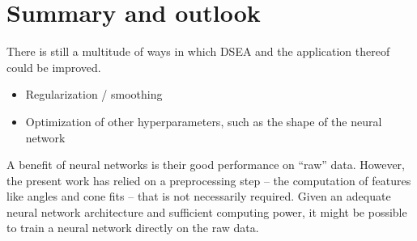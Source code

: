 \chapter{Summary and outlook}

There is still a multitude of ways in which DSEA and the application thereof could be improved.
\begin{itemize}
  \item Regularization / smoothing
  \item Optimization of other hyperparameters, such as the shape of the neural network
\end{itemize}

A benefit of neural networks is their good performance on \enquote{raw} data.
However,
the present work has relied on a preprocessing step %
  – the computation of features like angles and cone fits –
that is not necessarily required.
Given an adequate neural network architecture and sufficient computing power,
it might be possible to train a neural network directly on the raw data.
